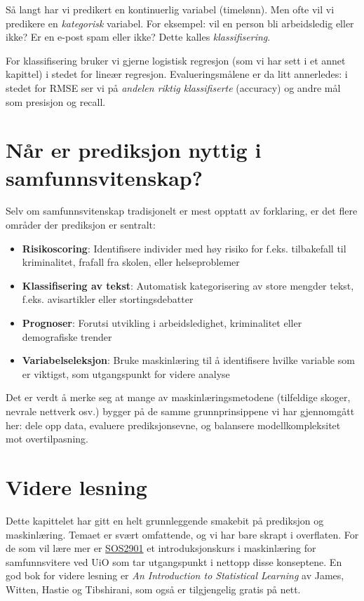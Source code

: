 \documentclass[
  norsk,
  letterpaper,
  DIV=11,
  numbers=noendperiod]{scrreprt}
\providecommand{\tightlist}{%
  \setlength{\itemsep}{0pt}\setlength{\parskip}{0pt}}
\theoremstyle{definition}
\theoremstyle{remark}
\begin{document}
Så langt har vi predikert en kontinuerlig variabel (timelønn). Men ofte
vil vi predikere en \emph{kategorisk} variabel. For eksempel: vil en
person bli arbeidsledig eller ikke? Er en e-post spam eller ikke? Dette
kalles \emph{klassifisering}.

For klassifisering bruker vi gjerne logistisk regresjon (som vi har sett
i et annet kapittel) i stedet for lineær regresjon. Evalueringsmålene er
da litt annerledes: i stedet for RMSE ser vi på \emph{andelen riktig
klassifiserte} (accuracy) og andre mål som presisjon og recall.

\section{Når er prediksjon nyttig i
samfunnsvitenskap?}\label{nuxe5r-er-prediksjon-nyttig-i-samfunnsvitenskap}

Selv om samfunnsvitenskap tradisjonelt er mest opptatt av forklaring, er
det flere områder der prediksjon er sentralt:

\begin{itemize}
\tightlist
\item
  \textbf{Risikoscoring}: Identifisere individer med høy risiko for
  f.eks. tilbakefall til kriminalitet, frafall fra skolen, eller
  helseproblemer
\item
  \textbf{Klassifisering av tekst}: Automatisk kategorisering av store
  mengder tekst, f.eks. avisartikler eller stortingsdebatter
\item
  \textbf{Prognoser}: Forutsi utvikling i arbeidsledighet, kriminalitet
  eller demografiske trender
\item
  \textbf{Variabelseleksjon}: Bruke maskinlæring til å identifisere
  hvilke variable som er viktigst, som utgangspunkt for videre analyse
\end{itemize}

Det er verdt å merke seg at mange av maskinlæringsmetodene (tilfeldige
skoger, nevrale nettverk osv.) bygger på de samme grunnprinsippene vi
har gjennomgått her: dele opp data, evaluere prediksjonsevne, og
balansere modellkompleksitet mot overtilpasning.

\section{Videre lesning}\label{videre-lesning}

Dette kapittelet har gitt en helt grunnleggende smakebit på prediksjon
og maskinlæring. Temaet er svært omfattende, og vi har bare skrapt i
overflaten. For de som vil lære mer er
\href{https://www.uio.no/studier/emner/sv/iss/SOS2901/index.html}{SOS2901}
et introduksjonskurs i maskinlæring for samfunnsvitere ved UiO som tar
utgangspunkt i nettopp disse konseptene. En god bok for videre lesning
er \emph{An Introduction to Statistical Learning} av James, Witten,
Hastie og Tibshirani, som også er tilgjengelig gratis på nett.
\end{document}
